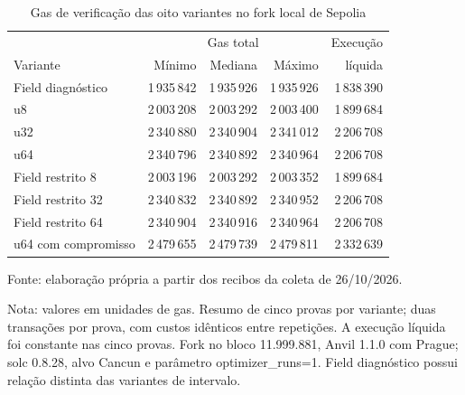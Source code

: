 \begin{table}[htbp]
\centering
\caption{Gas de verificação das oito variantes no fork local de Sepolia}
\label{tab:gas}
\small
\begin{tabular}{lrrrr}
\hline
 & \multicolumn{3}{c}{Gas total} & Execução \\
Variante & Mínimo & Mediana & Máximo & líquida \\
\hline
Field diagnóstico & 1\,935\,842 & 1\,935\,926 & 1\,935\,926 & 1\,838\,390 \\
u8 & 2\,003\,208 & 2\,003\,292 & 2\,003\,400 & 1\,899\,684 \\
u32 & 2\,340\,880 & 2\,340\,904 & 2\,341\,012 & 2\,206\,708 \\
u64 & 2\,340\,796 & 2\,340\,892 & 2\,340\,964 & 2\,206\,708 \\
Field restrito 8 & 2\,003\,196 & 2\,003\,292 & 2\,003\,352 & 1\,899\,684 \\
Field restrito 32 & 2\,340\,832 & 2\,340\,892 & 2\,340\,952 & 2\,206\,708 \\
Field restrito 64 & 2\,340\,904 & 2\,340\,916 & 2\,340\,964 & 2\,206\,708 \\
u64 com compromisso & 2\,479\,655 & 2\,479\,739 & 2\,479\,811 & 2\,332\,639 \\
\hline
\end{tabular}
\par\smallskip
\begin{minipage}{\textwidth}
\renewcommand{\baselinestretch}{1}\small
Fonte: elaboração própria a partir dos recibos da coleta de 26/10/2026.\par
Nota: valores em unidades de gas. Resumo de cinco provas por variante; duas transações por prova, com custos idênticos entre repetições. A execução líquida foi constante nas cinco provas. Fork no bloco 11.999.881, Anvil 1.1.0 com Prague; solc 0.8.28, alvo Cancun e parâmetro optimizer\_runs=1. Field diagnóstico possui relação distinta das variantes de intervalo.
\end{minipage}
\end{table}
